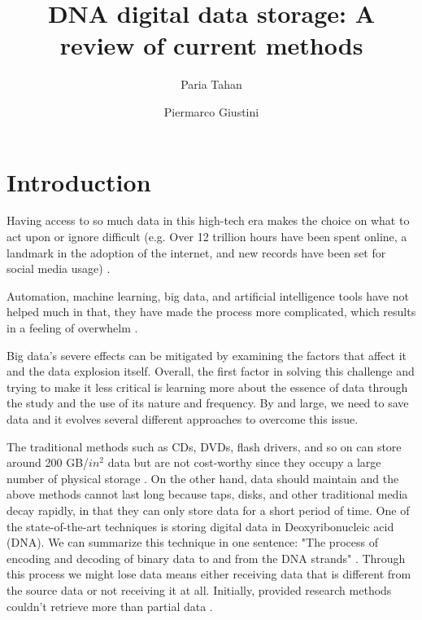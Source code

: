 \documentclass[10pt,twocolumn,twoside]{gsajnl}
\title{DNA digital data storage: A review of current methods}
\author[1]{Paria Tahan}
\author[2]{Piermarco Giustini}
\affil[1]{paria.tahan@studenti.unipd.it}
\affil[2]{piermarco.giustini@studenti.unipd.it}
\theoremstyle{definition}
\begin{document}
\maketitle
\thispagestyle{firststyle}
\vspace{-10pt}%


\section{Introduction}

\lettrine[lines=2]{\color{color2}H}{}aving access to so much data in this high-tech era makes the choice on what to act upon or ignore difficult (e.g. Over 12 trillion hours have been spent online, a landmark in the adoption of the internet, and new records have been set for social media usage) \cite{datareportal}.

Automation, machine learning, big data, and artificial intelligence tools have not helped much in that, they have made the process more complicated, which results in a feeling of overwhelm \cite{alliance2021preserving}.

Big data's severe effects can be mitigated by examining the factors that affect it and the data explosion itself. Overall, the first factor in solving this challenge and trying to make it less critical is learning more about the essence of data through the study and the use of its nature and frequency. By and large, we need to save data and it evolves several different approaches to overcome this issue. 

The traditional methods such as CDs, DVDs, flash drivers, and so on can store around 200 GB/$in^2$ data but are not cost-worthy since they occupy a large number of physical storage \cite{wang2019high}. On the other hand, data should maintain and the above methods cannot last long because taps, disks, and other traditional media decay rapidly, in that they can only store data for a short period of time. One of the state-of-the-art techniques is storing digital data in Deoxyribonucleic acid (DNA). We can summarize this technique in one sentence: "The process of encoding and decoding of binary data to and from the DNA strands" \cite{ceze2019molecular}. Through this process we might lose data means either receiving data that is different from the source data or not receiving it at all. Initially, provided research methods couldn't retrieve more than partial data \cite{church2012next}.
\end{document}
